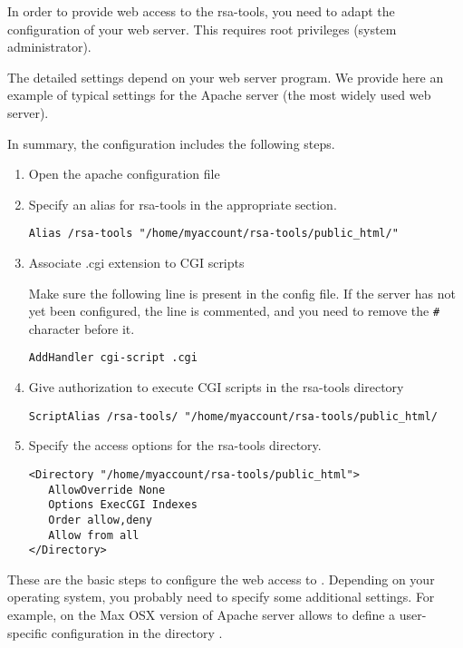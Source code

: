 \documentclass{article}
\begin{document}
In order to provide web access to the rsa-tools, you need to adapt the
configuration of your web server. This requires root privileges
(system administrator). 


The detailed settings depend on your web server program. We provide
here an example of typical settings for the Apache server (the most
widely used web server).

In summary, the configuration includes the following steps.

\begin{enumerate}
\item Open the apache configuration file 

\item Specify an alias for rsa-tools in the appropriate section.

\begin{verbatim}
Alias /rsa-tools "/home/myaccount/rsa-tools/public_html/"
\end{verbatim}


\item Associate .cgi extension to CGI scripts

Make sure the following line is present in the config file. If the
server has not yet been configured, the line is commented, and you
need to remove the \texttt{\#} character before it.

\begin{verbatim}
AddHandler cgi-script .cgi
\end{verbatim}

\item Give authorization to execute CGI scripts in the rsa-tools directory

\begin{verbatim}
ScriptAlias /rsa-tools/ "/home/myaccount/rsa-tools/public_html/
\end{verbatim}

\item Specify the access options for the rsa-tools directory.

\begin{verbatim}
<Directory "/home/myaccount/rsa-tools/public_html">
   AllowOverride None
   Options ExecCGI Indexes
   Order allow,deny
   Allow from all
</Directory>
\end{verbatim}

\end{enumerate}

These are the basic steps to configure the web access to
\RSAT. Depending on your operating system, you probably need to
specify some additional settings. For example, on the Max OSX version
of Apache server allows to define a user-specific configuration in the
directory .
\end{document}
